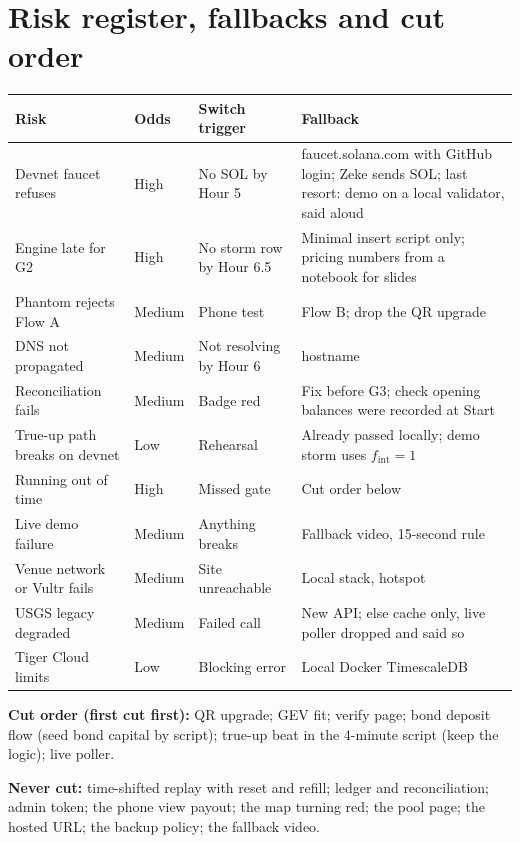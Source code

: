 \documentclass[11pt]{article}
\newcommand{\code}[1]{\texttt{\detokenize{#1}}}
\begin{document}
\section{Risk register, fallbacks and cut order}
{\small
\begin{xltabular}{\linewidth}{@{}L{3.7cm} L{1.4cm} L{3.4cm} Y@{}}
\toprule
Risk & Odds & Switch trigger & Fallback \\
\midrule
\endhead
Devnet faucet refuses & High & No SOL by Hour 5 & faucet.solana.com with GitHub login; Zeke sends SOL; last resort: demo on a local validator, said aloud \\
Engine late for G2 & High & No storm row by Hour 6.5 & Minimal insert script only; pricing numbers from a notebook for slides \\
Phantom rejects Flow A & Medium & Phone test & Flow B; drop the QR upgrade \\
DNS not propagated & Medium & Not resolving by Hour 6 & \code{sslip.io} hostname \\
Reconciliation fails & Medium & Badge red & Fix before G3; check opening balances were recorded at Start \\
True-up path breaks on devnet & Low & Rehearsal & Already passed locally; demo storm uses $f_\text{int}=1$ \\
Running out of time & High & Missed gate & Cut order below \\
Live demo failure & Medium & Anything breaks & Fallback video, 15-second rule \\
Venue network or Vultr fails & Medium & Site unreachable & Local stack, hotspot \\
USGS legacy degraded & Medium & Failed call & New API; else cache only, live poller dropped and said so \\
Tiger Cloud limits & Low & Blocking error & Local Docker TimescaleDB \\
\bottomrule
\end{xltabular}
}

\textbf{Cut order (first cut first):} QR upgrade; GEV fit; verify page; bond deposit flow (seed bond capital by script); true-up beat in the 4-minute script (keep the logic); live poller.

\textbf{Never cut:} time-shifted replay with reset and refill; ledger and reconciliation; admin token; the phone view payout; the map turning red; the pool page; the hosted URL; the backup policy; the fallback video.

\end{document}
